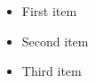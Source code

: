 \documentclass{article}
\begin{document}
\begin{itemize}
    \item First item
    \item Second item
    \item Third item
\end{itemize}
\end{document}
